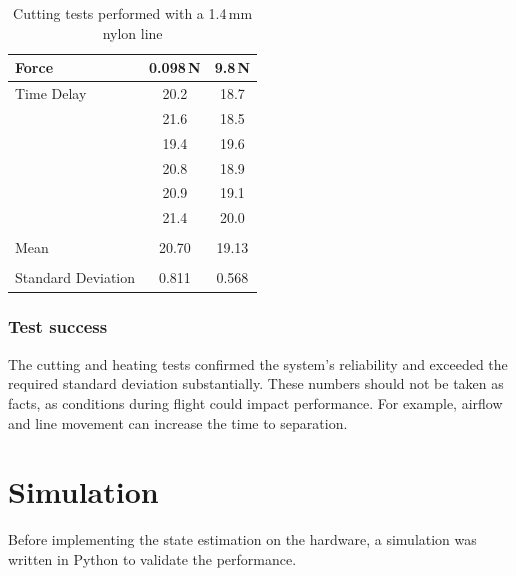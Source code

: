 \begin{table}[h]
    \centering
    \begin{tabular}{ m{4cm} | m{1.5cm} | m{1.5cm} } 
      \hline
      Force                 & \multicolumn{1}{c}{0.098\,N} & \multicolumn{1}{|c}{9.8\,N}  \\ \hline
      Time Delay            & \multicolumn{1}{c}{20.2}    & \multicolumn{1}{|c}{18.7}       \\
                            & \multicolumn{1}{c}{21.6}    & \multicolumn{1}{|c}{18.5}       \\
                            & \multicolumn{1}{c}{19.4}    & \multicolumn{1}{|c}{19.6}       \\
                            & \multicolumn{1}{c}{20.8}    & \multicolumn{1}{|c}{18.9}       \\
                            & \multicolumn{1}{c}{20.9}    & \multicolumn{1}{|c}{19.1}       \\
                            & \multicolumn{1}{c}{21.4}    & \multicolumn{1}{|c}{20.0}       \\
                            & \multicolumn{1}{c}{}        &  \multicolumn{1}{|c}{}          \\
      Mean                  & \multicolumn{1}{c}{20.70}   &\multicolumn{1}{|c}{19.13}      \\
                            & \multicolumn{1}{c}{}        &  \multicolumn{1}{|c}{}          \\
      Standard Deviation    & \multicolumn{1}{c}{0.811}   &\multicolumn{1}{|c}{0.568}      \\
    \end{tabular}
    \caption{\label{tab:nylon-14}Cutting tests performed with a 1.4\,mm nylon line}
\end{table}

\subsubsection{Test success}
The cutting and heating tests confirmed the system's reliability and exceeded the required standard deviation substantially. These numbers should not be taken as facts, as conditions during flight could impact performance. For example, airflow and line movement can increase the time to separation.

\newpage

\section{Simulation}
Before implementing the state estimation on the hardware, a simulation was written in Python to validate the performance.

